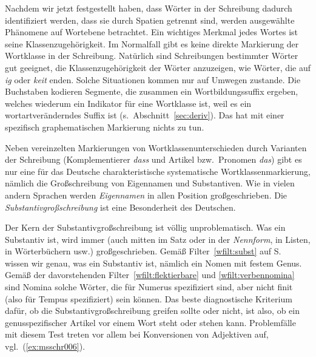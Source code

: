 \label{sec:wortklassschreib}

Nachdem wir jetzt festgestellt haben, dass Wörter in der Schreibung dadurch identifiziert werden, dass sie durch Spatien getrennt sind, werden ausgewählte Phänomene auf Wortebene betrachtet.
Ein wichtiges Merkmal jedes Wortes ist seine Klassenzugehörigkeit.
Im Normalfall gibt es keine direkte Markierung der Wortklasse in der Schreibung.
Natürlich sind Schreibungen bestimmter Wörter gut geeignet, die Klassenzugehörigkeit der Wörter anzuzeigen, wie \zB Wörter, die auf \textit{ig} oder \textit{keit} enden.
Solche Situationen kommen nur auf Umwegen zustande.
Die Buchstaben kodieren Segmente, die zusammen ein Wortbildungssuffix ergeben, welches wiederum ein Indikator für eine Wortklasse ist, weil es ein wortartveränderndes Suffix ist (s.\ Abschnitt~\ref{sec:deriv}).
Das hat mit einer spezifisch graphematischen Markierung nichts zu tun.

Neben vereinzelten Markierungen von Wortklassenunterschieden durch Varianten der Schreibung (Komplementierer \textit{dass} und Artikel bzw.\ Pronomen \textit{das}) gibt es nur eine für das Deutsche charakteristische systematische Wortklassenmarkierung, nämlich die Großschreibung von Eigennamen und Substantiven.
Wie in vielen andern Sprachen werden \textit{Eigennamen} in allen Position großgeschrieben.
Die \textit{Substantivgroßschreibung} ist eine Besonderheit des Deutschen.


Der Kern der Substantivgroßschreibung ist völlig unproblematisch.
Was ein Substantiv ist, wird immer (auch mitten im Satz oder in der \textit{Nennform}, in Listen, in Wörterbüchern usw.) großgeschrieben.
Gemäß Filter~\ref{wfilt:subst} auf S.~\pageref{wfilt:subst} wissen wir genau, was ein Substantiv ist, nämlich ein Nomen mit festem Genus.
Gemäß der davorstehenden Filter~\ref{wfilt:flektierbare} und \ref{wfilt:verbennomina} sind Nomina solche Wörter, die für Numerus spezifiziert sind, aber nicht finit (also für Tempus spezifiziert) sein können.
Das beste diagnostische Kriterium dafür, ob die Substantivgroßschreibung greifen sollte oder nicht, ist also, ob ein genusspezifischer Artikel vor einem Wort steht oder stehen kann.
Problemfälle mit diesem Test treten vor allem bei Konversionen von Adjektiven auf, vgl.\ (\ref{ex:msschr006}).

